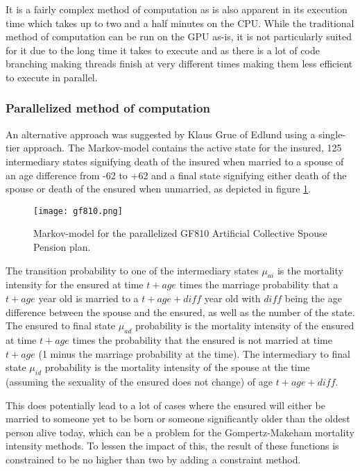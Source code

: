 It is a fairly complex method of computation as is also apparent in its execution time which takes up to two and a half minutes on the CPU.
While the traditional method of computation can be run on the GPU as-is, it is not particularly suited for it due to the long time it takes to execute and as there is a lot of code branching making threads finish at very different times making them less efficient to execute in parallel.

\subsubsection{Parallelized method of computation}\label{subsubsec:gf810parallelized}
An alternative approach was suggested by Klaus Grue of Edlund using a single-tier approach.
The Markov-model contains the active state for the insured, 125 intermediary states signifying death of the insured when married to a spouse of an age difference from -62 to +62 and a final state signifying either death of the spouse or death of the ensured when unmarried, as depicted in figure \ref{fig:gf810}.

\begin{figure}[h!]\centering
\texttt{[image: gf810.png]}
\caption{Markov-model for the parallelized GF810 Artificial Collective Spouse Pension plan.\label{fig:gf810}}
\end{figure}
\newcommand*{\diff}{\ensuremath{\mathit{diff}}}
The transition probability to one of the intermediary states $\mu_{ai}$ is the mortality intensity for the ensured at time $t + age$ times the marriage probability that a $t + age$ year old is married to a $t + age + \diff$ year old with $\diff$ being the age difference between the spouse and the ensured, as well as the number of the state.
The ensured to final state $\mu_{ad}$ probability is the mortality intensity of the ensured at time $t + age$ times the probability that the ensured is not married at time $t + age$ (1 minus the marriage probability at the time).
The intermediary to final state $\mu_{id}$ probability is the mortality intensity of the spouse at the time (assuming the sexuality of the ensured does not change) of age $t + age + \diff$.

This does potentially lead to a lot of cases where the ensured will either be married to someone yet to be born or someone significantly older than the oldest person alive today, which can be a problem for the Gompertz-Makeham mortality intensity methods.
To lessen the impact of this, the result of these functions is constrained to be no higher than two by adding a constraint method.

